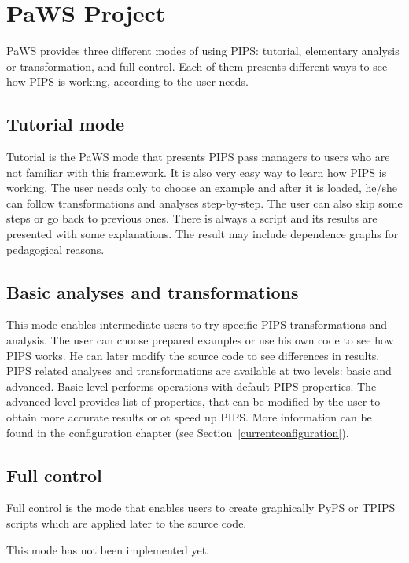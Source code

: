 \section{PaWS Project}
\label{paws_project}

PaWS provides three different modes of using PIPS: tutorial,
elementary analysis or transformation, and full control. Each of them
presents different ways to see how PIPS is working, according to
the user needs.


\subsection{Tutorial mode}

Tutorial is the PaWS mode that presents PIPS pass managers to users who
are not familiar with this framework. It is also very easy way to
learn how PIPS is working. The user needs only to choose an example
and after it is loaded, he/she can follow transformations and analyses
step-by-step. The user can also skip some steps or go back to previous
ones. There is always a script and its results are presented with some
explanations. The result may include dependence graphs for pedagogical
reasons.

\subsection{Basic analyses and transformations}

This mode enables intermediate users to try specific PIPS
transformations and analysis. The user can choose prepared examples or
use his own code to see how PIPS works. He can later modify the source
code to see differences in results. PIPS related analyses and
transformations are available at two levels: basic and advanced. Basic
level performs operations with default PIPS properties. The advanced
level provides list of properties, that can be modified by the user to
obtain more accurate results or ot speed up PIPS. More information can
be found in the configuration chapter (see Section~\ref{currentconfiguration}).

\subsection{Full control}

Full control is the mode that enables users to create graphically PyPS
or TPIPS scripts which are applied later to the source code.

This mode has not been implemented yet.
